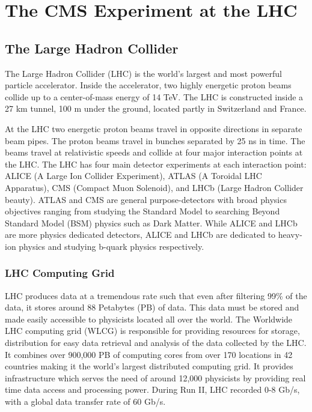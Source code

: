 \chapter{The CMS Experiment at the LHC}
\label{chapter:three}
\section{The Large Hadron Collider}

The Large Hadron Collider (LHC) \cite{LHC} is the world’s largest and most powerful particle accelerator. Inside the accelerator, two highly energetic proton beams collide up to a center-of-mass energy of 14 TeV. The LHC is constructed inside a 27 km tunnel, 100 m under the ground, located partly in Switzerland and France.

At the LHC two energetic proton beams travel in opposite directions in separate beam pipes. The proton beams travel in bunches separated by 25 ns in time. The beams travel at relativistic speeds and collide at four major interaction points at the LHC. The LHC has four main detector experiments at each interaction point: ALICE (A Large Ion Collider Experiment), ATLAS (A Toroidal LHC Apparatus), CMS (Compact Muon Solenoid), and LHCb (Large Hadron Collider beauty). ATLAS and CMS are general purpose-detectors with broad physics objectives ranging from studying the Standard Model to searching Beyond Standard Model (BSM) physics such as Dark Matter. While ALICE and LHCb are more physics dedicated detectors, ALICE and LHCb are dedicated to heavy-ion physics and studying b-quark physics respectively.
\subsection{LHC Computing Grid}
LHC produces data at a tremendous rate such that even after filtering 99\% of the data, it stores around 88 Petabytes (PB) of data. This data must be stored and made easily accessible to physicists located all over the world. The Worldwide LHC computing grid (WLCG)  \cite{Molina:2014sia_wlcg} is responsible for providing resources for storage, distribution for easy data retrieval and analysis of the data collected by the LHC. It combines over 900,000 PB of computing cores from over 170 locations in 42 countries making it the world's largest distributed computing grid. It provides infrastructure which serves the need of around 12,000 physicists by providing real time data access and processing power. During Run II, LHC recorded  0-8 Gb/s, with a global data transfer rate of 60 Gb/s.  

